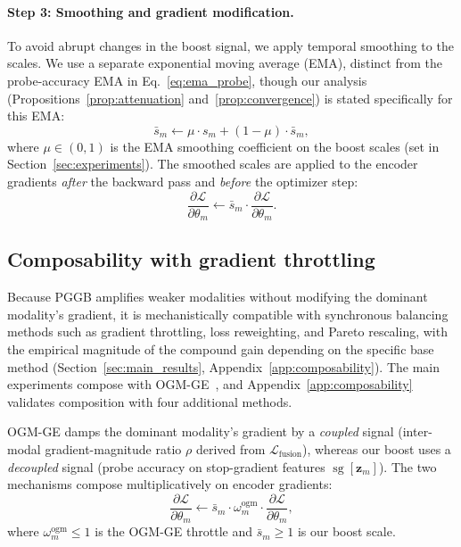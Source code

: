 \documentclass{article} %
\newcommand{\loss}{\mathcal{L}}
\newcommand{\sg}{\operatorname{sg}}
\begin{document}
\paragraph{Step 3: Smoothing and gradient modification.}
To avoid abrupt changes in the boost signal, we apply temporal smoothing to the scales. We use a separate exponential moving average (EMA), distinct from the probe-accuracy EMA in Eq.~\eqref{eq:ema_probe}, though our analysis (Propositions~\ref{prop:attenuation} and~\ref{prop:convergence}) is stated specifically for this EMA:
%
\begin{equation}
\label{eq:ema_scale}
\bar{s}_m \leftarrow \mu \cdot s_m + (1 - \mu) \cdot \bar{s}_m,
\end{equation}
%
where $\mu \in (0,1)$ is the EMA smoothing coefficient on the boost scales (set in Section~\ref{sec:experiments}). The smoothed scales are applied to the encoder gradients \emph{after} the backward pass and \emph{before} the optimizer step:
%
\begin{equation}
\label{eq:gradient_mod}
\frac{\partial \loss}{\partial \theta_m} \leftarrow \bar{s}_m \cdot \frac{\partial \loss}{\partial \theta_m}.
\end{equation}
%

\subsection{Composability with gradient throttling}
\label{sec:compose}

Because PGGB amplifies weaker modalities without modifying the dominant modality's gradient, it is mechanistically compatible with synchronous balancing methods such as gradient throttling, loss reweighting, and Pareto rescaling, with the empirical magnitude of the compound gain depending on the specific base method (Section~\ref{sec:main_results}, Appendix~\ref{app:composability}). The main experiments compose with OGM-GE~\citep{peng2022ogmge}, and Appendix~\ref{app:composability} validates composition with four additional methods.

OGM-GE damps the dominant modality's gradient by a \emph{coupled} signal (inter-modal gradient-magnitude ratio $\rho$ derived from $\loss_{\text{fusion}}$), whereas our boost uses a \emph{decoupled} signal (probe accuracy on stop-gradient features $\sg[\mathbf{z}_m]$). The two mechanisms compose multiplicatively on encoder gradients:
%
\begin{equation}
\label{eq:combined}
\frac{\partial \loss}{\partial \theta_m} \leftarrow \bar{s}_m \cdot \omega_m^{\text{ogm}} \cdot \frac{\partial \loss}{\partial \theta_m},
\end{equation}
%
where $\omega_m^{\text{ogm}} \leq 1$ is the OGM-GE throttle and $\bar{s}_m \geq 1$ is our boost scale. 
\end{document}
